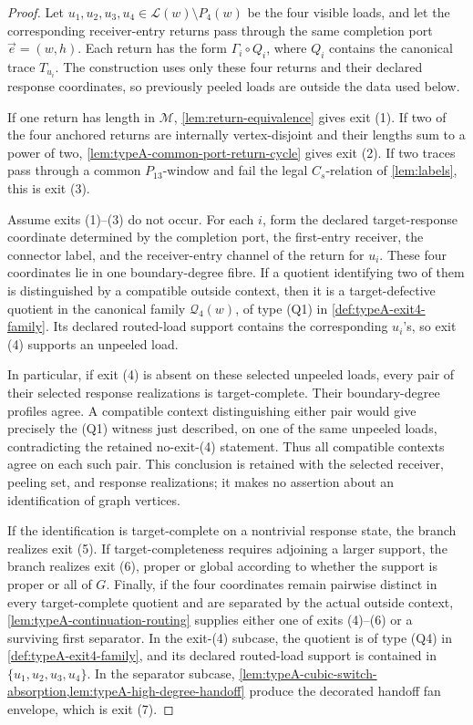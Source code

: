 \documentclass[11pt]{article}
\newcommand{\Mers}{\mathcal M}
\begin{document}
\begin{proof}
Let \(u_1,u_2,u_3,u_4\in\mathcal L(w)\setminus P_4(w)\) be the four visible
loads, and let the corresponding receiver-entry returns pass through the same
completion port \(\vec e=(w,h)\).  Each return has the form \(\Gamma_i\circ Q_i\),
where \(Q_i\) contains the canonical trace \(T_{u_i}\).  The construction uses
only these four returns and their declared response coordinates, so previously
peeled loads are outside the data used below.

If one return has length in \(\Mers\), \cref{lem:return-equivalence} gives exit
(1).  If two of the four anchored returns are internally vertex-disjoint and
their lengths sum to a power of two, \cref{lem:typeA-common-port-return-cycle}
gives exit (2).  If two traces pass through a common \(P_{13}\)-window and fail
the legal \(C_s\)-relation of \cref{lem:labels}, this is exit (3).

Assume exits (1)--(3) do not occur.  For each \(i\), form the declared
target-response coordinate determined by the completion port, the first-entry
receiver, the connector label, and the receiver-entry channel of the return for
\(u_i\).  These four coordinates lie in one boundary-degree fibre.  If a
quotient identifying two of them is distinguished by a compatible outside
context, then it is a target-defective quotient in the canonical family
\(\mathcal Q_4(w)\), of type \textup{(Q1)} in
\cref{def:typeA-exit4-family}.  Its declared routed-load support contains the
corresponding \(u_i\)'s, so exit (4) supports an unpeeled load.

In particular, if exit (4) is absent on these selected unpeeled loads, every
pair of their selected response realizations is target-complete.  Their
boundary-degree profiles agree.  A compatible context distinguishing either
pair would give precisely the \textup{(Q1)} witness just described, on one
of the same unpeeled loads, contradicting the retained no-exit-(4) statement.
Thus all compatible contexts agree on each such pair.  This conclusion is
retained with the selected receiver, peeling set, and response realizations;
it makes no assertion about an identification of graph vertices.

If the identification is target-complete on a nontrivial response state, the
branch realizes exit (5).  If target-completeness requires adjoining a larger
support, the branch realizes exit (6), proper or global according to whether the
support is proper or all of \(G\).  Finally, if the four coordinates remain
pairwise distinct in every target-complete quotient and are separated by the
actual outside context, \cref{lem:typeA-continuation-routing} supplies either
one of exits (4)--(6) or a surviving first separator.  In the exit-(4) subcase,
the quotient is of type \textup{(Q4)} in \cref{def:typeA-exit4-family}, and its
declared routed-load support is contained in
\(\{u_1,u_2,u_3,u_4\}\).  In the separator subcase,
\cref{lem:typeA-cubic-switch-absorption,lem:typeA-high-degree-handoff} produce
the decorated handoff fan envelope, which is exit (7).
\end{proof}
\end{document}
